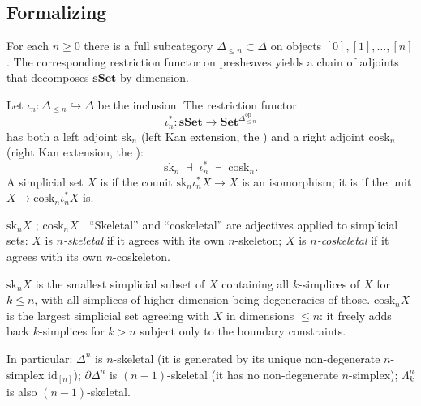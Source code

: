\subsection{Formalizing}

For each $n \geq 0$ there is a full subcategory $\Delta_{\leq n} \subset
\Delta$ on objects $[0], [1], \ldots, [n]$. The corresponding restriction
functor on presheaves yields a chain of adjoints that decomposes
$\mathbf{sSet}$ by dimension.

\begin{definition}
\label{def:skel-cosk}
Let $\iota_n : \Delta_{\leq n} \hookrightarrow \Delta$ be the inclusion.
The restriction functor
\begin{equation*}
  \iota_n^* : \mathbf{sSet} \longrightarrow \mathbf{Set}^{\Delta_{\leq n}^{\mathrm{op}}}
\end{equation*}
has both a left adjoint $\mathrm{sk}_n$ (left Kan extension, the
) and a right adjoint $\mathrm{cosk}_n$ (right Kan
extension, the ):
\begin{equation*}
  \mathrm{sk}_n \;\dashv\; \iota_n^* \;\dashv\; \mathrm{cosk}_n.
\end{equation*}
A simplicial set $X$ is  if the counit
$\mathrm{sk}_n \iota_n^* X \to X$ is an isomorphism; it is
 if the unit $X \to \mathrm{cosk}_n \iota_n^* X$ is.
\end{definition}

\begin{howtosay}
$\mathrm{sk}_n X$ ; $\mathrm{cosk}_n X$
. ``Skeletal'' and ``coskeletal''
are adjectives applied to simplicial sets: $X$ is \emph{$n$-skeletal}
if it agrees with its own $n$-skeleton; $X$ is \emph{$n$-coskeletal} if
it agrees with its own $n$-coskeleton.
\end{howtosay}

\begin{remark}
$\mathrm{sk}_n X$ is the smallest simplicial subset of $X$ containing
all $k$-simplices of $X$ for $k \leq n$, with all simplices of higher
dimension being degeneracies of those. $\mathrm{cosk}_n X$ is the largest
simplicial set agreeing with $X$ in dimensions $\leq n$: it freely adds
back $k$-simplices for $k > n$ subject only to the boundary constraints.

In particular: $\Delta^n$ is $n$-skeletal (it is generated by its unique
non-degenerate $n$-simplex $\mathrm{id}_{[n]}$); $\partial\Delta^n$ is
$(n-1)$-skeletal (it has no non-degenerate $n$-simplex); $\Lambda^n_k$ is
also $(n-1)$-skeletal.
\end{remark}

